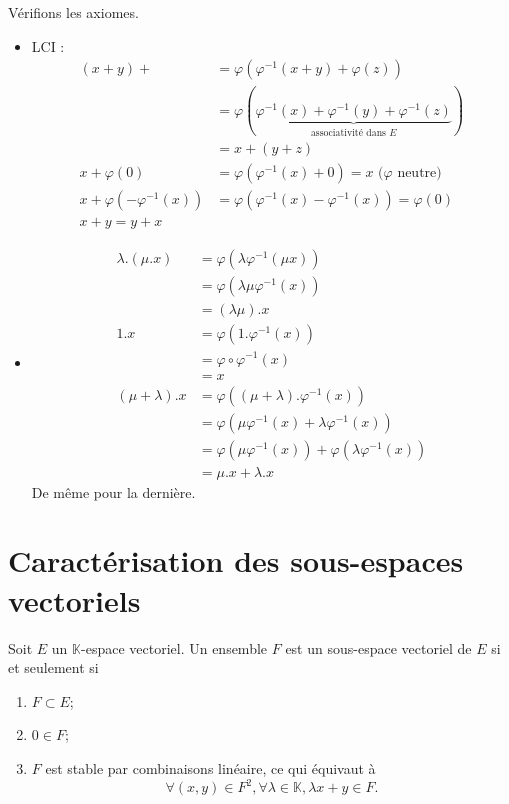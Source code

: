 \documentclass[../main.tex]{subfiles}
\begin{document}
\noindent Vérifions les axiomes. 
\begin{itemize}
    \item LCI : 
    \begin{align*}
        (x + y) +  &= \varphi(\varphi^{-1}(x+y) + \varphi(z)) \\
        &= \varphi(\underbrace{\varphi^{-1}(x) + \varphi^{-1}(y) + \varphi^{-1}(z)}_{\text{associativité dans $E$}}) \\
        &= x + (y + z) \\
        x + \varphi(0) &= \varphi(\varphi^{-1}(x) + 0) = x \text{ (} \varphi \text{ neutre)} \\
        x + \varphi(-\varphi^{-1}(x)) &= \varphi(\varphi^{-1}(x) - \varphi^{-1}(x)) = \varphi(0) \\
        x + y = y + x
    \end{align*}

    \item 
    \begin{align*}
        \lambda.(\mu.x) &= \varphi(\lambda \varphi^{-1}(\mu x)) \\
        &= \varphi(\lambda \mu \varphi^{-1}(x)) \\
        &= (\lambda \mu).x \\
        1.x &= \varphi(1.\varphi^{-1}(x)) \\
        &= \varphi\circ \varphi^{-1}(x) \\
        &= x \\
        (\mu + \lambda).x &= \varphi((\mu + \lambda).\varphi^{-1}(x)) \\
        &= \varphi(\mu \varphi^{-1}(x) + \lambda \varphi^{-1}(x)) \\
        &= \varphi(\mu \varphi^{-1}(x)) + \varphi(\lambda \varphi^{-1}(x)) \\
        &= \mu.x + \lambda.x
    \end{align*}
    De même pour la dernière. 
\end{itemize}

\section{Caractérisation des sous-espaces vectoriels}
\begin{tcolorbox}[title=Théorème 20.16, title filled=false, colframe=orange, colback=orange!10!white]
    Soit $E$ un $\mathbb{K}$-espace vectoriel. Un ensemble $F$ est un sous-espace vectoriel de $E$ si et seulement si
    \begin{enumerate}
        \item $F \subset E$;
        \item $0 \in F$;
        \item $F$ est stable par combinaisons linéaire, ce qui équivaut à 
        $$\forall (x, y) \in F^2, \forall \lambda\in \mathbb{K}, \lambda x + y \in F.$$
    \end{enumerate}
\end{tcolorbox}
\end{document}
